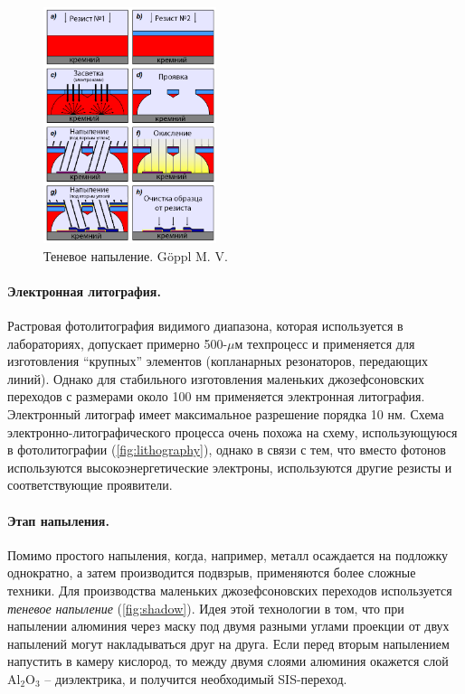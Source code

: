 \documentclass[12pt, twoside]{report}
\numberwithin{equation}{section}
\numberwithin{figure}{section}
\begin{document}
\begin{figure}
\centering
\includegraphics[width=0.45\textwidth]{Pictures/shadow}
\caption{Теневое напыление. G{\"o}ppl M. V.\cite{goppl2009}}
\label{fig:shadow}
\end{figure}

\paragraph{Электронная литография.} Растровая фотолитография видимого диапазона, которая используется в лабораториях, допускает примерно 500-$\mu$м техпроцесс и применяется для изготовления ``крупных'' элементов (копланарных резонаторов, передающих линий).  Однако для стабильного изготовления маленьких джозефсоновских переходов с размерами около 100 нм применяется электронная литография. Электронный литограф имеет максимальное разрешение порядка 10 нм. Схема электронно-литографического процесса очень похожа на схему, использующуюся в фотолитографии (\autoref{fig:lithography}), однако в связи с тем, что вместо фотонов используются высокоэнергетические электроны, используются другие резисты и соответствующие проявители.

\paragraph{Этап напыления.} Помимо простого напыления, когда, например, металл осаждается на подложку однократно, а затем производится подвзрыв, применяются более сложные техники. Для производства маленьких джозефсоновских переходов используется \textit{теневое напыление} (\autoref{fig:shadow}). Идея этой технологии в том, что при напылении алюминия через маску под двумя разными углами проекции от двух напылений могут накладываться друг на друга. Если перед вторым напылением напустить в камеру кислород, то между двумя слоями алюминия окажется слой Al$_2$O$_3$ -- диэлектрика, и получится необходимый SIS-переход. 
 
\end{document}
